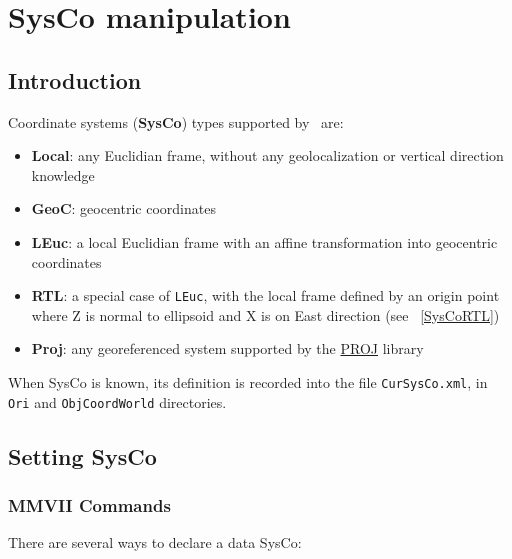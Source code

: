 \chapter{SysCo manipulation}
\label{Chap:SysCo}



\section{Introduction}

Coordinate systems (\textbf{SysCo}) types supported by \CdPPP\ are:
\begin{itemize}
\item \textbf{Local}: any Euclidian frame, without any geolocalization or vertical direction knowledge
\item \textbf{GeoC}: geocentric coordinates
\item \textbf{LEuc}: a local Euclidian frame with an affine transformation into geocentric coordinates
\item \textbf{RTL}: a special case of \texttt{LEuc}, with the local frame defined by an origin point where Z is normal to ellipsoid and X is on East direction (see ~\ref{SysCoRTL})
\item \textbf{Proj}: any georeferenced system supported by the \href{https://proj.org}{PROJ} library
\end{itemize}

When SysCo is known, its definition is recorded into the file \texttt{CurSysCo.xml}, in \texttt{Ori} and \texttt{ObjCoordWorld} directories.


\section{Setting SysCo}

\subsection{MMVII Commands}
There are several ways to declare a data SysCo:

